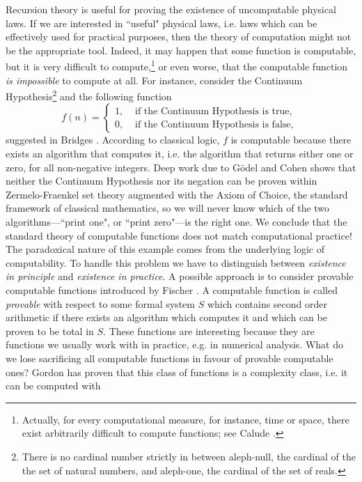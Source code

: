 Recursion theory is useful for proving the existence of uncomputable
physical laws.
If we are interested in ``useful" physical laws, i.e. laws
which can be effectively used for practical purposes, then the theory of
computation
might not be the appropriate tool. Indeed, it
 may happen that some function is computable, but it is very difficult
to compute,\footnote{Actually, for every computational  measure, for
instance,  time
or space, there exist arbitrarily difficult to compute functions; see
Calude \cite{ca1}.}
or even worse,  that the computable function
 {\it is impossible} to compute  at all. For instance, consider the Continuum
Hypothesis\footnote{There is no
cardinal
number  strictly in between aleph-null, the cardinal of the the set of
natural numbers, and aleph-one, the cardinal of the set of reals.} and the
following function
 \[f(n) = \left\{ \begin{array}{ll}
1, & \mbox{ if the Continuum Hypothesis is true,}\\
0, &  \mbox{ if the  Continuum Hypothesis is false, }
\end{array}
\right.\]
suggested in Bridges \cite{bridges}.
According to classical logic,  $f$ is computable because there exists an
algorithm
that computes it,
i.e. the algorithm that returns either one or zero,  for all non-negative
integers. Deep work
due to G\"{o}del
\cite{goedel3} and Cohen\cite{cohen} shows that neither the  Continuum
Hypothesis nor its negation can be proven within
Zermelo-Fraenkel set
theory augmented with the Axiom of Choice, the standard framework of
classical mathematics,
so we will never know which of the two algorithms---``print one", or
``print zero"---is the right one. We
conclude
that the standard theory of computable functions does not match
computational practice!
The paradoxical nature of this example comes from the underlying logic of
computability.
To handle this problem we have to distinguish between {\it existence in
principle}
and {\it existence in practice}. A possible approach is to consider
provable computable
functions introduced by Fischer \cite{fischer}. A  computable function is
called {\it provable}
with respect to some formal system $S$ which contains second order
arithmetic if there
exists an algorithm which computes it and which can be proven to be total
in $S$. These
functions are interesting because they are  functions we usually work
with in practice, e.g.
in numerical analysis. What do we lose sacrificing all computable functions
in favour of
provable computable ones? Gordon \cite{gordon} has proven  that
this class of functions is a complexity class, i.e. it can be computed with
